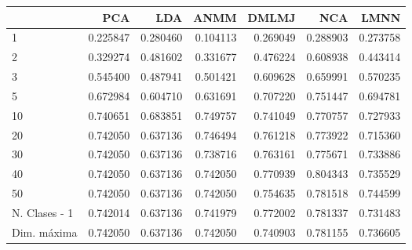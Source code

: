 \begin{tabular}{lrrrrrr}
\toprule
{} &       PCA &       LDA &      ANMM &     DMLMJ &       NCA &      LMNN \\
\midrule
1             &  0.225847 &  0.280460 &  0.104113 &  0.269049 &  0.288903 &  0.273758 \\
2             &  0.329274 &  0.481602 &  0.331677 &  0.476224 &  0.608938 &  0.443414 \\
3             &  0.545400 &  0.487941 &  0.501421 &  0.609628 &  0.659991 &  0.570235 \\
5             &  0.672984 &  0.604710 &  0.631691 &  0.707220 &  0.751447 &  0.694781 \\
10            &  0.740651 &  0.683851 &  0.749757 &  0.741049 &  0.770757 &  0.727933 \\
20            &  0.742050 &  0.637136 &  0.746494 &  0.761218 &  0.773922 &  0.715360 \\
30            &  0.742050 &  0.637136 &  0.738716 &  0.763161 &  0.775671 &  0.733886 \\
40            &  0.742050 &  0.637136 &  0.742050 &  0.770939 &  0.804343 &  0.735529 \\
50            &  0.742050 &  0.637136 &  0.742050 &  0.754635 &  0.781518 &  0.744599 \\
N. Clases - 1 &  0.742014 &  0.637136 &  0.741979 &  0.772002 &  0.781337 &  0.731483 \\
Dim. máxima   &  0.742050 &  0.637136 &  0.742050 &  0.740903 &  0.781155 &  0.736605 \\
\bottomrule
\end{tabular}
